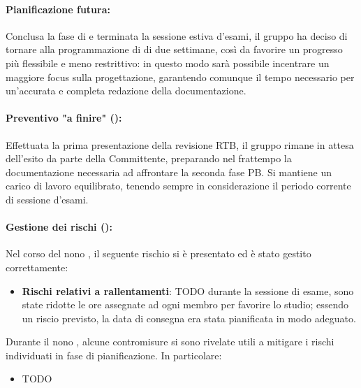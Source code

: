 \paragraph*{Pianificazione futura:}
\par Conclusa la fase di \RTB e terminata la sessione estiva d'esami, il gruppo ha deciso di tornare alla programmazione di  di due settimane, così da favorire un progresso più flessibile e meno restrittivo: in questo modo sarà possibile incentrare un maggiore focus sulla progettazione, garantendo comunque il tempo necessario per un'accurata e completa redazione della documentazione.

\paragraph*{Preventivo "a finire" ():}
\par Effettuata la prima presentazione della revisione RTB, il gruppo rimane in attesa dell'esito da parte della Committente, preparando nel frattempo la documentazione necessaria ad affrontare la seconda fase PB. Si mantiene un carico di lavoro equilibrato, tenendo sempre in considerazione il periodo corrente di sessione d'esami.

\paragraph*{Gestione dei rischi ():}
\par Nel corso del nono , il seguente rischio si è presentato ed è stato gestito correttamente:
\begin{itemize}
  \item \textbf{Rischi relativi a rallentamenti}: TODO durante la sessione di esame, sono state ridotte le ore assegnate ad ogni membro per favorire lo studio; essendo un riscio previsto, la data di consegna era stata pianificata in modo adeguato.
\end{itemize}

\vspace{0.5\baselineskip}
\par Durante il nono , alcune contromisure si sono rivelate utili a mitigare i rischi individuati in fase di pianificazione. In particolare:
\begin{itemize}
  \item TODO
\end{itemize}
